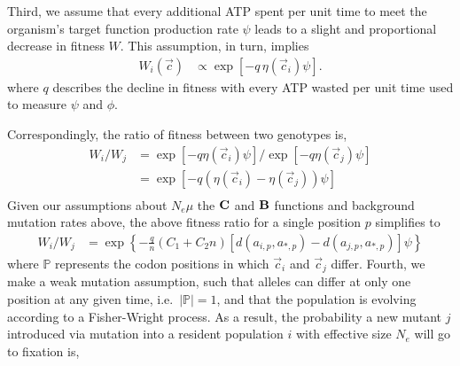 \documentclass{article}
\newcommand{\Cost}{\ensuremath{\text{\textbf{C}}}\xspace}
\newcommand{\Func}{\ensuremath{\text{\textbf{B}}}\xspace}
\newcommand{\Ne}{\ensuremath{{N_e}}\xspace} %
\newcommand{\Nemu}{\ensuremath{{N_e \mu}}\xspace} %
\newcommand{\aip}{\ensuremath{a_{i,p}}\xspace}
\newcommand{\ajp}{\ensuremath{a_{j,p}}\xspace}
\newcommand{\aoptp}{\ensuremath{a_{*,p}}\xspace}
\newcommand{\cveci}{\ensuremath{\cvec_i}\xspace}
\newcommand{\cvecj}{\ensuremath{\cvec_j}\xspace}
\newcommand{\cvec}{\ensuremath{\Vec{c}}\xspace}
\newcommand{\kmax}{\ensuremath{{k_{\max}}}\xspace}
\newcommand{\setP}{\ensuremath{\mathbb{P}}\xspace}
\begin{document}
Third, we assume that every additional ATP spent per unit time to meet the organism's target function production rate $\psi$ leads to a slight and proportional decrease in fitness $W$.
This assumption, in turn, implies 
\begin{align}
  W_i\left(\cvec\right) &\propto \exp\left[- q \, \eta(\cveci) \psi\right].
\end{align}
where $q$ describes the decline in fitness with every ATP wasted per unit time used to measure $\psi$ and $\phi$.

Correspondingly, the ratio of fitness between two genotypes is,
\begin{align*}
  W_i/W_j &=  \exp\left[- q \eta(\cveci) \psi\right]/\exp\left[- q \eta(\cvecj) \psi\right]\\
  &=  \exp\left[- q \left(\eta(\cveci)- \eta(\cvecj)\right) \psi\right]\\
\end{align*}
Given our assumptions about $\Nemu$ the \Cost and \Func functions and background mutation rates above, the above fitness ratio for a single position $p$ simplifies to
\begin{align}
 W_i/W_j  &= \exp\left\{- \frac{q}{n} \left(C_1 + C_2 n\right) \left[d\left(\aip,\aoptp\right) - d\left(\ajp,\aoptp\right)\right] \psi \right\}
\end{align}
where \setP represents the codon positions in which \cveci and \cvecj differ.
Fourth, we make a weak mutation assumption, such that alleles can differ at only one position at any given time, i.e.~$|\setP| = 1$, and that the population is evolving according to a Fisher-Wright process.
As a result, the probability a new mutant $j$ introduced via mutation into a resident population $i$ with effective size \Ne will go to fixation is,
\end{document}
